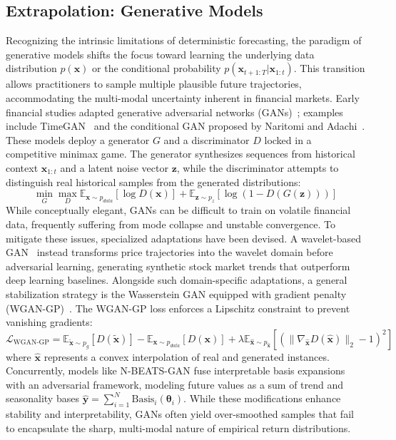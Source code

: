 \subsection{Extrapolation: Generative Models}

Recognizing the intrinsic limitations of deterministic forecasting, the paradigm of generative models shifts the focus toward learning the underlying data distribution $p(\mathbf{x})$ or the conditional probability $p(\mathbf{x}_{t+1:T}|\mathbf{x}_{1:t})$. This transition allows practitioners to sample multiple plausible future trajectories, accommodating the multi-modal uncertainty inherent in financial markets. Early financial studies adapted generative adversarial networks (GANs)~\citep{goodfellow2014gan}; examples include TimeGAN~\citep{Time-GAN} and the conditional GAN proposed by Naritomi and Adachi~\citep{naritomi2020data}. These models deploy a generator $G$ and a discriminator $D$ locked in a competitive minimax game. The generator synthesizes sequences from historical context $\mathbf{x}_{1:t}$ and a latent noise vector $\mathbf{z}$, while the discriminator attempts to distinguish real historical samples from the generated distributions:
\begin{equation}
\min_G \max_D \mathbb{E}_{\mathbf{x} \sim p_{data}}[\log D(\mathbf{x})] + \mathbb{E}_{\mathbf{z} \sim p_z}[\log(1 - D(G(\mathbf{z})))]
\end{equation}
While conceptually elegant, GANs can be difficult to train on volatile financial data, frequently suffering from mode collapse and unstable convergence. To mitigate these issues, specialized adaptations have been devised. A wavelet-based GAN~\citep{dai2024wavegan} instead transforms price trajectories into the wavelet domain before adversarial learning, generating synthetic stock market trends that outperform deep learning baselines. Alongside such domain-specific adaptations, a general stabilization strategy is the Wasserstein GAN equipped with gradient penalty (WGAN-GP)~\citep{arjovsky2017wgan,gulrajani2017wgangp}. The WGAN-GP loss enforces a Lipschitz constraint to prevent vanishing gradients:
\begin{equation}
\mathcal{L}_{\text{WGAN-GP}} = \mathbb{E}_{\tilde{\mathbf{x}} \sim p_g}[D(\tilde{\mathbf{x}})] - \mathbb{E}_{\mathbf{x} \sim p_{data}}[D(\mathbf{x})] + \lambda \mathbb{E}_{\hat{\mathbf{x}} \sim p_{\hat{\mathbf{x}}}}[(\|\nabla_{\hat{\mathbf{x}}} D(\hat{\mathbf{x}})\|_2 - 1)^2]
\end{equation}
where $\hat{\mathbf{x}}$ represents a convex interpolation of real and generated instances. Concurrently, models like N-BEATS-GAN \citep{dai2026nbeats} fuse interpretable basis expansions \citep{oreshkin2020nbeats} with an adversarial framework, modeling future values as a sum of trend and seasonality bases $\hat{\mathbf{y}} = \sum_{i=1}^N \text{Basis}_i(\boldsymbol{\theta}_i)$. While these modifications enhance stability and interpretability, GANs often yield over-smoothed samples that fail to encapsulate the sharp, multi-modal nature of empirical return distributions.

